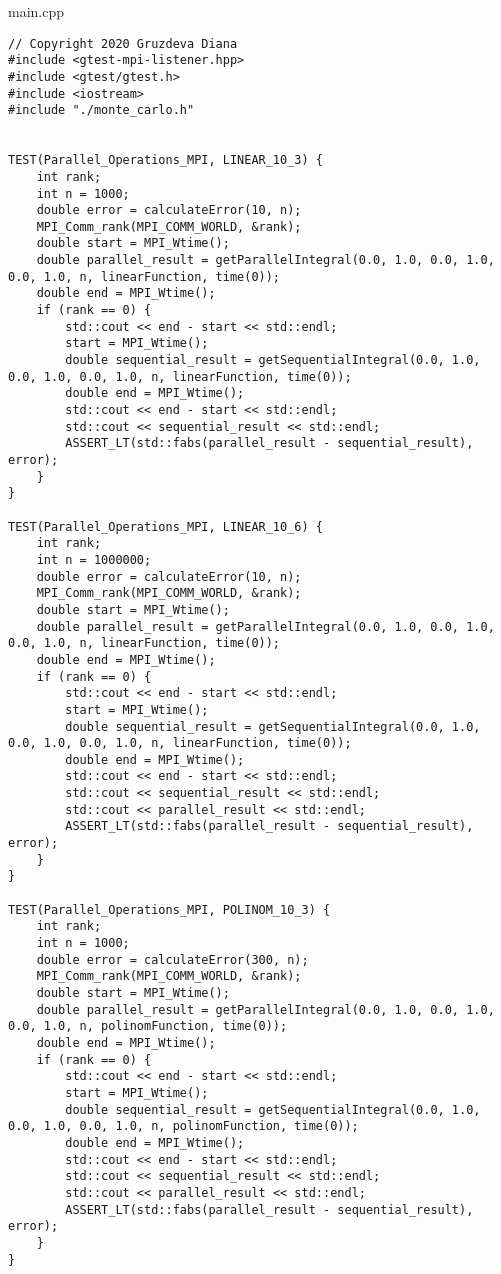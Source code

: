 \documentclass{report}
\begin{document}
main.cpp
\begin{lstlisting}
// Copyright 2020 Gruzdeva Diana
#include <gtest-mpi-listener.hpp>
#include <gtest/gtest.h>
#include <iostream>
#include "./monte_carlo.h"


TEST(Parallel_Operations_MPI, LINEAR_10_3) {
    int rank;
    int n = 1000;
    double error = calculateError(10, n);
    MPI_Comm_rank(MPI_COMM_WORLD, &rank);
    double start = MPI_Wtime();
    double parallel_result = getParallelIntegral(0.0, 1.0, 0.0, 1.0, 0.0, 1.0, n, linearFunction, time(0));
    double end = MPI_Wtime();
    if (rank == 0) {
        std::cout << end - start << std::endl;
        start = MPI_Wtime();
        double sequential_result = getSequentialIntegral(0.0, 1.0, 0.0, 1.0, 0.0, 1.0, n, linearFunction, time(0));
        double end = MPI_Wtime();
        std::cout << end - start << std::endl;
        std::cout << sequential_result << std::endl;
        ASSERT_LT(std::fabs(parallel_result - sequential_result), error);
    }
}

TEST(Parallel_Operations_MPI, LINEAR_10_6) {
    int rank;
    int n = 1000000;
    double error = calculateError(10, n);
    MPI_Comm_rank(MPI_COMM_WORLD, &rank);
    double start = MPI_Wtime();
    double parallel_result = getParallelIntegral(0.0, 1.0, 0.0, 1.0, 0.0, 1.0, n, linearFunction, time(0));
    double end = MPI_Wtime();
    if (rank == 0) {
        std::cout << end - start << std::endl;
        start = MPI_Wtime();
        double sequential_result = getSequentialIntegral(0.0, 1.0, 0.0, 1.0, 0.0, 1.0, n, linearFunction, time(0));
        double end = MPI_Wtime();
        std::cout << end - start << std::endl;
        std::cout << sequential_result << std::endl;
        std::cout << parallel_result << std::endl;
        ASSERT_LT(std::fabs(parallel_result - sequential_result), error);
    }
}

TEST(Parallel_Operations_MPI, POLINOM_10_3) {
    int rank;
    int n = 1000;
    double error = calculateError(300, n);
    MPI_Comm_rank(MPI_COMM_WORLD, &rank);
    double start = MPI_Wtime();
    double parallel_result = getParallelIntegral(0.0, 1.0, 0.0, 1.0, 0.0, 1.0, n, polinomFunction, time(0));
    double end = MPI_Wtime();
    if (rank == 0) {
        std::cout << end - start << std::endl;
        start = MPI_Wtime();
        double sequential_result = getSequentialIntegral(0.0, 1.0, 0.0, 1.0, 0.0, 1.0, n, polinomFunction, time(0));
        double end = MPI_Wtime();
        std::cout << end - start << std::endl;
        std::cout << sequential_result << std::endl;
        std::cout << parallel_result << std::endl;
        ASSERT_LT(std::fabs(parallel_result - sequential_result), error);
    }
}


\end{lstlisting}
\end{document}
